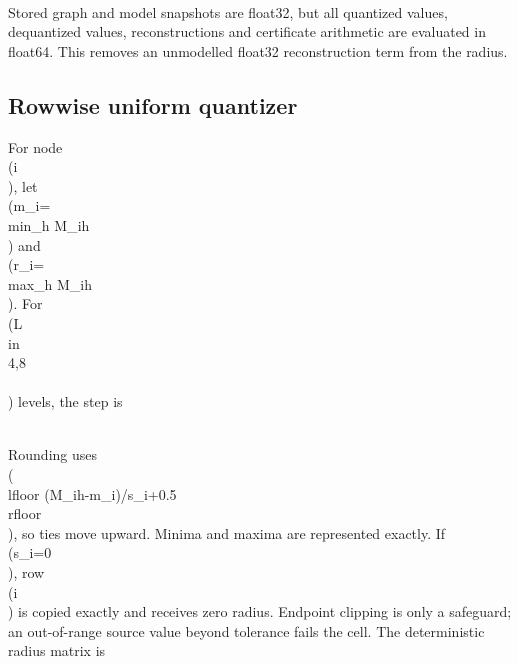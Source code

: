 \documentclass{article}
\begin{document}
\\[
Z=A\\operatorname{relu}(AM+b\_0)W\_1+b\_\{\\mathrm{out}\}.
\\]

Stored graph and model snapshots are float32, but all quantized values, dequantized values, reconstructions and certificate arithmetic are evaluated in float64. This removes an unmodelled float32 reconstruction term from the radius.

\subsection{Rowwise uniform quantizer}

\label{sec:rowwise\_uniform\_quantizer}

For node \\(i\\), let \\(m\_i=\\min\_h M_{ih}\\) and \\(r\_i=\\max\_h M_{ih}\\). For \\(L\\in\\{4,8\\}\\) levels, the step is

\\[
s\_i=\\frac{r\_i-m\_i}\{L-1\}.
\\]

Rounding uses \\(\\lfloor (M_{ih}-m\_i)/s\_i+0.5\\rfloor\\), so ties move upward. Minima and maxima are represented exactly. If \\(s\_i=0\\), row \\(i\\) is copied exactly and receives zero radius. Endpoint clipping is only a safeguard; an out-of-range source value beyond tolerance fails the cell. The deterministic radius matrix is

\\[
\\Delta\_\{ih\}=s\_i/2.
\\]
\end{document}
